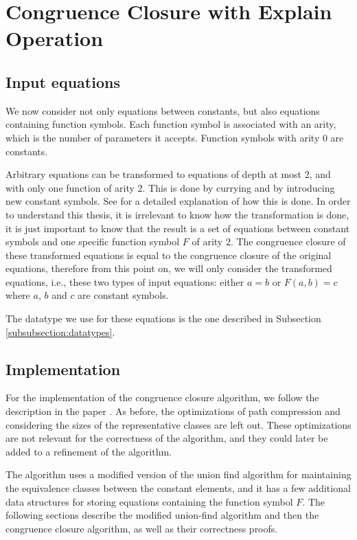 
\chapter{Congruence Closure with Explain Operation}\label{chapter:congruence_closure}

\section{Input equations}

We now consider not only equations between constants, but also equations containing function symbols. Each function symbol is associated with an arity, which is the number of parameters it accepts. Function symbols with arity 0 are constants.

Arbitrary equations can be transformed to equations of depth at most 2, and with only one function of arity 2. This is done by currying and by introducing new constant symbols. See \cite{Nieuwenhuis2} for a detailed explanation of how this is done. In order to understand this thesis, it is irrelevant to know how the transformation is done, it is just important to know that the result is a set of equations between constant symbols and one specific function symbol $F$ of arity 2. The congruence closure of these transformed equations is equal to the congruence closure of the original equations, therefore from this point on, we will only consider the transformed equations, i.e., these two types of input equations: either $a = b$ or $F(a,b) = c$ where $a$, $b$ and $c$ are constant symbols.

The datatype we use for these equations is the one described in Subsection \ref{subsubsection:datatypes}.

\section{Implementation}

For the implementation of the congruence closure algorithm, we follow the description in the paper \cite{Nieuwenhuis}. As before, the optimizations of path compression and considering the sizes of the representative classes are left out. These optimizations are not relevant for the correctness of the algorithm, and they could later be added to a refinement of the algorithm.

The algorithm uses a modified version of the union find algorithm for maintaining the equivalence classes between the constant elements, and it has a few additional data structures for storing equations containing the function symbol $F$. The following sections describe the modified union-find algorithm and then the congruence closure algorithm, as well as their correctness proofs.

